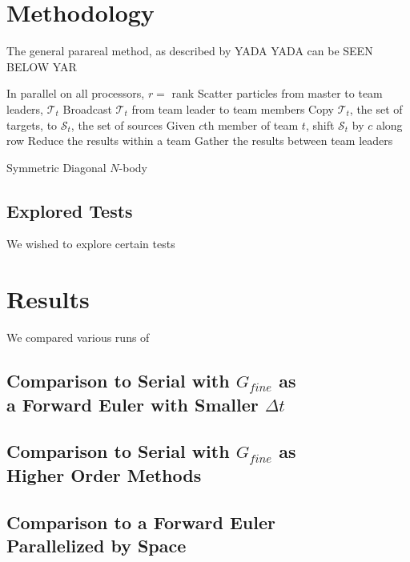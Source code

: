 \documentclass[letterpaper,twocolumn,11pt]{article}
\begin{document}
\section{Methodology}

The general parareal method, as described by YADA YADA can be SEEN BELOW YAR

\begin{algorithm}[t]
 In parallel on all processors, $r = $ rank\;
 Scatter particles from master to team leaders, $\mathcal{T}_t$\;
 Broadcast $\mathcal{T}_t$ from team leader to team members\;
 Copy $\mathcal{T}_t$, the set of targets, to $\mathcal{S}_t$, the set of sources\;
 Given $c$th member of team $t$, shift $\mathcal{S}_t$ by $c$ along row\;
 Reduce the results within a team\;
 Gather the results between team leaders\;
 \caption{Symmetric Diagonal $N$-body}
 \label{alg:symmdiag}
\end{algorithm}

\subsection{Explored Tests}
We wished to explore certain tests

\section{Results}
We compared various runs of 

\subsection{Comparison to Serial with $G_{fine}$ as \\a Forward Euler with Smaller $\Delta t$}

\subsection{Comparison to Serial with $G_{fine}$ as \\Higher Order Methods}

\subsection{Comparison to a Forward Euler \\Parallelized by Space}
\end{document}

